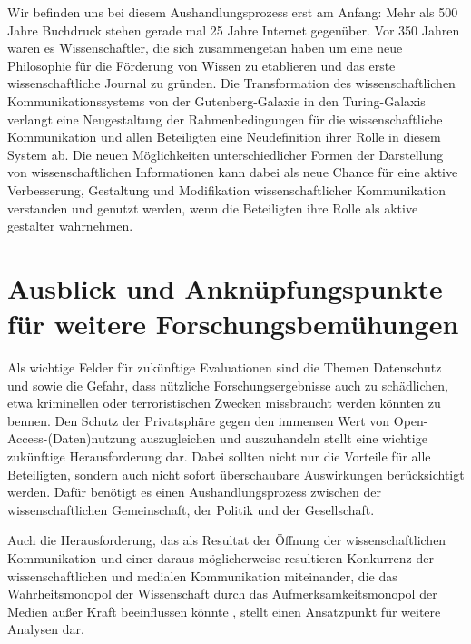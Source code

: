 Wir befinden uns bei diesem Aushandlungsprozess erst am Anfang: Mehr als 500 Jahre Buchdruck stehen gerade mal 25 Jahre Internet gegenüber. Vor 350 Jahren waren es Wissenschaftler, die sich zusammengetan haben um eine neue Philosophie für die Förderung von Wissen zu etablieren und das erste wissenschaftliche Journal zu gründen. Die Transformation des wissenschaftlichen Kommunikationssystems von der Gutenberg-Galaxie in den Turing-Galaxis verlangt eine Neugestaltung der Rahmenbedingungen für die wissenschaftliche Kommunikation und allen Beteiligten eine Neudefinition ihrer Rolle in diesem System ab. Die neuen Möglichkeiten unterschiedlicher Formen der Darstellung von wissenschaftlichen Informationen kann dabei als neue Chance für eine aktive Verbesserung, Gestaltung und Modifikation wissenschaftlicher Kommunikation verstanden und genutzt werden, wenn die Beteiligten ihre Rolle als aktive gestalter wahrnehmen.

\section{Ausblick und Anknüpfungspunkte für weitere Forschungsbemühungen}

Als wichtige Felder für zukünftige Evaluationen sind die Themen Datenschutz und sowie die Gefahr, dass nützliche Forschungsergebnisse auch zu schädlichen, etwa kriminellen oder terroristischen Zwecken missbraucht werden könnten \cite{Fritsch_2015} zu bennen. Den Schutz der Privatsphäre gegen den immensen Wert von Open-Access-(Daten)nutzung auszugleichen und auszuhandeln stellt eine wichtige zukünftige Herausforderung dar. Dabei sollten nicht nur die Vorteile für alle Beteiligten, sondern auch nicht sofort überschaubare Auswirkungen berücksichtigt werden. Dafür benötigt es einen Aushandlungsprozess zwischen der wissenschaftlichen Gemeinschaft, der Politik und der Gesellschaft.

Auch die Herausforderung, das als Resultat der Öffnung der wissenschaftlichen Kommunikation und einer daraus möglicherweise resultieren Konkurrenz der wissenschaftlichen und medialen Kommunikation miteinander, die das Wahrheitsmonopol der Wissenschaft durch das Aufmerksamkeitsmonopol der Medien außer Kraft beeinflussen könnte \cite{weingart_2005_wissenschaft}, stellt einen Ansatzpunkt für weitere Analysen dar.

